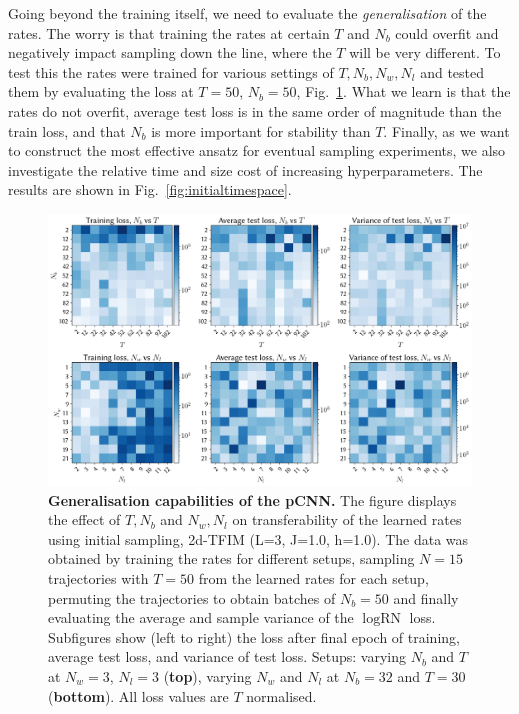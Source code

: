 Going beyond the training itself, we need to evaluate the \emph{generalisation} of the rates. The worry is that training the rates at certain $T$ and $N_b$ could overfit and negatively impact sampling down the line, where the $T$ will be very different. To test this the rates were trained for various settings of $T, N_b, N_w, N_l$ and tested them by evaluating the loss at $T=50$, $N_b=50$, Fig.~\ref{fig:avgvarloss}. What we learn is that the rates do not overfit, average test loss is in the same order of magnitude than the train loss, and that $N_b$ is more important for stability than $T$. Finally, as we want to construct the most effective ansatz for eventual sampling experiments, we also investigate the relative time and size cost of increasing hyperparameters. The results are shown in Fig.~\ref{fig:initialtimespace}.

\begin{figure}[H]
	\centering
	\includegraphics[width=\linewidth]{Chapter5/Figs/Raster/avg_var_loss}
	\caption[Generalisation capabilities of the pCNN]{\textbf{Generalisation capabilities of the pCNN.} The figure displays the effect of $T, N_b$ and $N_w, N_l$ on transferability of the learned rates using initial sampling, 2d-TFIM (L=3, J=1.0, h=1.0). The data was obtained by training the rates for different setups, sampling $N=15$ trajectories with $T=50$ from the learned rates for each setup, permuting the trajectories to obtain batches of $N_b=50$ and finally evaluating the average and sample variance of the $\log \text{RN}$ loss. Subfigures show (left to right) the loss after final epoch of training, average test loss, and variance of test loss. Setups: varying $N_b$ and $T$ at $N_w=3$, $N_l=3$ (\textbf{top}), varying $N_w$ and $N_l$ at $N_b=32$ and $T=30$ (\textbf{bottom}). All loss values are $T$ normalised.}
	\label{fig:avgvarloss}
\end{figure}

